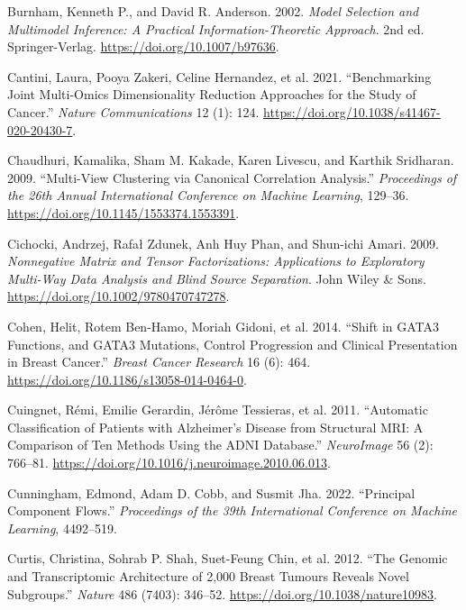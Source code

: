 \documentclass[
  10pt,
  letterpaper,
]{report}
\newlength{\cslhangindent}
\newenvironment{CSLReferences}[2] %
 {\begin{list}{}{%
  \setlength{\itemindent}{0pt}
  \setlength{\leftmargin}{0pt}
  \setlength{\parsep}{0pt}
  \ifodd #1
   \setlength{\leftmargin}{\cslhangindent}
   \setlength{\itemindent}{-1\cslhangindent}
  \fi
  \setlength{\itemsep}{#2\baselineskip}}}
 {\end{list}}
\begin{document}
\begin{CSLReferences}{1}{1}
Burnham, Kenneth P., and David R. Anderson. 2002. \emph{Model Selection
and Multimodel Inference: A Practical Information-Theoretic Approach}.
2nd ed. Springer-Verlag. \url{https://doi.org/10.1007/b97636}.

Cantini, Laura, Pooya Zakeri, Celine Hernandez, et al. 2021.
{``Benchmarking Joint Multi-Omics Dimensionality Reduction Approaches
for the Study of Cancer.''} \emph{Nature Communications} 12 (1): 124.
\url{https://doi.org/10.1038/s41467-020-20430-7}.

Chaudhuri, Kamalika, Sham M. Kakade, Karen Livescu, and Karthik
Sridharan. 2009. {``Multi-View Clustering via Canonical Correlation
Analysis.''} \emph{Proceedings of the 26th Annual International
Conference on Machine Learning}, 129--36.
\url{https://doi.org/10.1145/1553374.1553391}.

Cichocki, Andrzej, Rafał Zdunek, Anh Huy Phan, and Shun-ichi Amari.
2009. \emph{Nonnegative Matrix and Tensor Factorizations: Applications
to Exploratory Multi-Way Data Analysis and Blind Source Separation}.
John Wiley \& Sons. \url{https://doi.org/10.1002/9780470747278}.

Cohen, Helit, Rotem Ben-Hamo, Moriah Gidoni, et al. 2014. {``Shift in
{GATA3} Functions, and {GATA3} Mutations, Control Progression and
Clinical Presentation in Breast Cancer.''} \emph{Breast Cancer Research}
16 (6): 464. \url{https://doi.org/10.1186/s13058-014-0464-0}.

Cuingnet, Rémi, Emilie Gerardin, Jérôme Tessieras, et al. 2011.
{``Automatic Classification of Patients with {Alzheimer's} Disease from
Structural {MRI}: A Comparison of Ten Methods Using the {ADNI}
Database.''} \emph{NeuroImage} 56 (2): 766--81.
\url{https://doi.org/10.1016/j.neuroimage.2010.06.013}.

Cunningham, Edmond, Adam D. Cobb, and Susmit Jha. 2022. {``Principal
Component Flows.''} \emph{Proceedings of the 39th International
Conference on Machine Learning}, 4492--519.

{Curtis, Christina, Sohrab P. Shah, Suet-Feung Chin, et al.} 2012.
{``The Genomic and Transcriptomic Architecture of 2,000 Breast Tumours
Reveals Novel Subgroups.''} \emph{Nature} 486 (7403): 346--52.
\url{https://doi.org/10.1038/nature10983}.


\end{CSLReferences}
\end{document}
